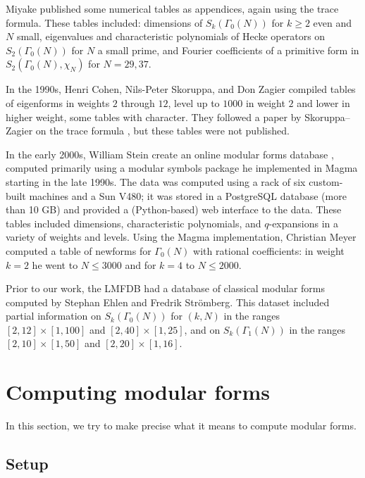 \documentclass[11pt]{amsart}
\numberwithin{equation}{subsection}
\theoremstyle{plain}
\theoremstyle{definition}
\newcommand{\jv}[1]{{\color{red} \textsf{[[JV: #1]]}}}
\begin{document}
Miyake \cite{Miyake} published some numerical tables as appendices, again using the trace formula.  These tables included: dimensions of $S_k(\Gamma_0(N))$ for $k \geq 2$ even and $N$ small, eigenvalues and characteristic polynomials of Hecke operators on $S_2(\Gamma_0(N))$ for $N$ a small prime, and Fourier coefficients of a primitive form in $S_2(\Gamma_0(N),\chi_N)$ for $N=29,37$.

In the 1990s, Henri Cohen, Nils-Peter Skoruppa, and Don Zagier compiled tables of eigenforms in weights $2$ through $12$, level up to $1000$ in weight $2$ and lower in higher weight, some tables with character.  They followed a paper by Skoruppa--Zagier on the trace formula \cite{SkoruppaZagier}, but these tables were not published.  

In the early 2000s, William Stein create an online modular forms database \cite{Stein:Tables}, computed primarily using a modular symbols package \cite{Stein} he implemented in \textsf{Magma} \cite{Magma} starting in the late 1990s.  The data was computed using a rack of six custom-built machines and a Sun V480; it was stored in a PostgreSQL database (more than 10 GB) and provided a (Python-based) web interface to the data.  These tables included dimensions, characteristic polynomials, and $q$-expansions in a variety of weights and levels.  Using the Magma implementation, Christian Meyer \cite{Meyer1,Meyer2} computed a table of newforms for $\Gamma_0(N)$ with rational coefficients: in weight $k=2$ he went to $N \leq 3000$ and for $k=4$ to $N \leq 2000$.

Prior to our work, the LMFDB had a database of classical modular forms computed by Stephan Ehlen and Fredrik Str\"omberg.  This dataset included partial information on $S_k(\Gamma_0(N))$ for $(k,N)$ in the ranges $[2,12] \times [1,100]$ and $[2,40] \times [1,25]$, and on $S_k(\Gamma_1(N))$ in the ranges $[2,10] \times [1,50]$ and $[2,20] \times [1,16]$.  

\section{Computing modular forms} \label{sec:compmf}

In this section, we try to make precise what it means to compute modular forms.

\subsection{Setup}
\end{document}
